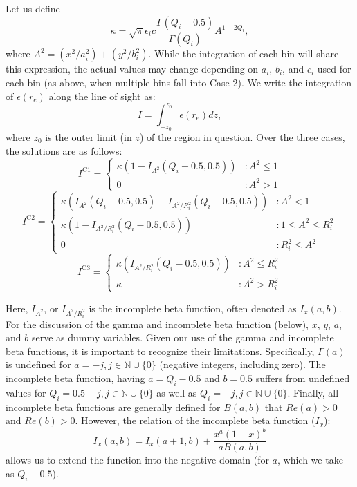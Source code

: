 \documentclass[onecolumn,traditabstract]{aa}
\begin{document}
Let us define
\begin{equation}
  \kappa = \sqrt{\pi}\epsilon_i c \frac{\Gamma(Q_i-0.5)}{\Gamma(Q_i)}A^{1-2Q_i},
\end{equation}
where $A^2 = (x^2 / a_i^2) + (y^2 / b_i^2)$. While the integration of each bin will share this expression,
the actual values may change depending on $a_i$, $b_i$, and $c_i$ used for
each bin (as above, when multiple bins fall into Case 2). We write the  integration of $\epsilon(r_e)$ along the line of sight as:
\begin{equation}
  I = \int_{-z_0}^{z_0} \epsilon(r_e) dz,
  \label{eqn:los_int_setup}
\end{equation}
where $z_0$ is the outer limit (in $z$) of the region in question. Over the three cases, the solutions are as follows:
\begin{equation}
  I^{\text{C1}} = \left\{
  \begin{array}{lr}
    \kappa (1-I_{A^2}(Q_i-0.5,0.5)) &: A^2 \leq 1 \\
    0 &: A^2 > 1
  \end{array}
  \right.
  \label{eqn:case1_int}
\end{equation}
\begin{equation}
  I^{\text{C2}} = \left\{
  \begin{array}{lr}
    \kappa (I_{A^2}(Q_i-0.5,0.5)-I_{A^2/R_i^2}(Q_i-0.5,0.5)) &: A^2 < 1 \\
    \kappa (1-I_{A^2/R_i^2}(Q_i-0.5,0.5)) &: 1 \leq A^2 \leq R_i^2 \\
    0 &: R_i^2 \leq A^2
  \end{array}
  \right.
\end{equation}
\begin{equation}
  I^{\text{C3}} = \left\{
  \begin{array}{lr}
    \kappa (I_{A^2/R_i^2}(Q_i-0.5,0.5)) &: A^2 \leq R_i^2 \\
    \kappa &: A^2 > R_i^2
  \end{array}
  \right.
\end{equation}

Here, $I_{A^2}$, or $I_{A^2/R_i^2}$ is the incomplete beta function, often denoted as $I_x(a,b)$. For the discussion of
the gamma and incomplete beta function (below), $x$, $y$, $a$, and $b$ serve as dummy variables. Given our use of
the gamma and incomplete beta functions, it is important to recognize their limitations.
Specifically, $\Gamma(a)$ is undefined for $a = -j, j \in \mathbb{N} \cup \{0\}$ (negative integers, including
zero). The incomplete beta function, having $a = Q_i -0.5$ and $b = 0.5$ suffers from undefined values
for $Q_i = 0.5-j, j \in \mathbb{N} \cup \{0\}$ as well as $Q_i = -j, j \in \mathbb{N} \cup \{0\}$. Finally, all incomplete
beta functions are generally defined for $B(a,b)$ that $Re(a) > 0$ and $Re(b) > 0$. However, the relation of the
incomplete beta function ($I_x$):
\begin{equation}
  I_x(a,b) = I_x(a+1,b) + \frac{x^a (1-x)^b}{a B(a,b)}
  \label{eqn:recibeta}
\end{equation}
allows us to extend the function into the negative domain (for $a$, which we take as $Q_i-0.5$). 
\end{document}

